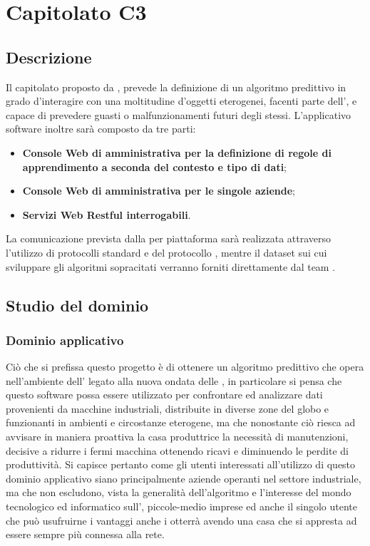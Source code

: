\section{Capitolato C3}

\subsection{Descrizione}
Il capitolato proposto da \Proponente{}, prevede la definizione di un algoritmo predittivo in grado d'interagire con una moltitudine d'oggetti eterogenei, facenti parte dell', e capace di prevedere guasti o malfunzionamenti futuri degli stessi.
L'applicativo software inoltre sar\`a composto da tre parti:
\begin{itemize}
	\item \textbf{Console Web di amministrativa per la definizione di regole di apprendimento a seconda del contesto e tipo di dati};
	\item\textbf{Console Web di amministrativa per le singole aziende};
	\item \textbf{Servizi Web Restful  interrogabili}.
\end{itemize}

La comunicazione prevista dalla per piattaforma sar\`a realizzata attraverso l'utilizzo di protocolli  standard e del protocollo , mentre il dataset sui cui sviluppare gli algoritmi sopracitati verranno forniti direttamente dal team \Proponente{}.

\subsection{Studio del dominio}
\subsubsection{Dominio applicativo}
Ci\`o che si prefissa questo progetto \`e di ottenere un algoritmo predittivo che opera nell'ambiente dell' legato alla nuova ondata delle , in particolare si pensa che questo software possa essere utilizzato per confrontare ed analizzare dati provenienti da macchine industriali, distribuite in diverse zone del globo e funzionanti in ambienti e circostanze eterogene, ma che nonostante ci\`o riesca ad avvisare in maniera proattiva la casa produttrice la necessit\`a di manutenzioni, decisive a ridurre i fermi macchina ottenendo ricavi e diminuendo le perdite di produttivit\`a.
Si capisce pertanto come gli utenti interessati all'utilizzo di questo dominio applicativo siano principalmente aziende operanti nel settore industriale, ma che non escludono, vista la generalit\`a dell'algoritmo e l'interesse del mondo tecnologico ed informatico sull', piccole-medio imprese ed anche il singolo utente che pu\`o usufruirne i vantaggi anche i otterr\`a avendo una casa che si appresta ad essere sempre pi\`u connessa alla rete.

